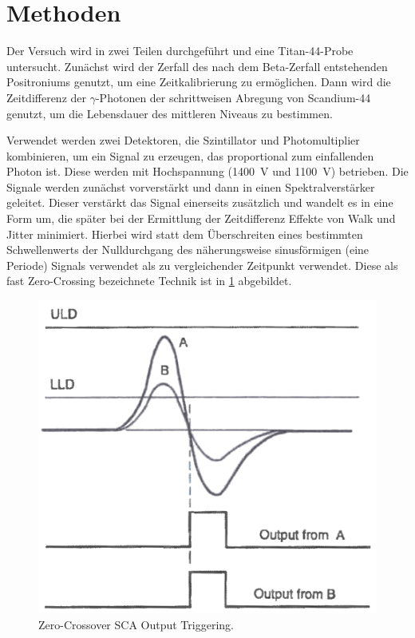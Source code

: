 \documentclass[
	a4paper,
	12pt,
	pagesize,
	ngerman
]{scrartcl}
\begin{document}
	\section{Methoden}
	Der Versuch wird in zwei Teilen durchgeführt und eine Titan-44-Probe untersucht.
	Zunächst wird der Zerfall des nach dem Beta-Zerfall entstehenden Positroniums genutzt, um eine Zeitkalibrierung zu ermöglichen.
	Dann wird die Zeitdifferenz der $\gamma$-Photonen der schrittweisen Abregung von Scandium-44 genutzt, um die Lebensdauer des mittleren Niveaus zu bestimmen.


	Verwendet werden zwei Detektoren, die Szintillator und Photomultiplier kombinieren, um ein Signal zu erzeugen, das proportional zum einfallenden Photon ist.
	Diese werden mit Hochspannung (\SI{1400}{V} und \SI{1100}{V}) betrieben.
	Die Signale werden zunächst vorverstärkt und dann in einen Spektralverstärker geleitet.
	Dieser verstärkt das Signal einerseits zusätzlich und wandelt es in eine Form um, die später bei der Ermittlung der Zeitdifferenz Effekte von Walk und Jitter minimiert.
	Hierbei wird statt dem Überschreiten eines bestimmten Schwellenwerts der Nulldurchgang des näherungsweise sinusförmigen (eine Periode) Signals verwendet als zu vergleichender Zeitpunkt verwendet.
	Diese als fast Zero-Crossing bezeichnete Technik ist in \cref{fig_Zero-Cross} abgebildet.

	\begin{figure}[H]
			\includegraphics[width=0.6\linewidth]{img/Zero-Cross}
			\caption{
			Zero-Crossover SCA Output Triggering.
			\cite{Anleitung}
			}
			\label{fig_Zero-Cross}
	\end{figure}
\end{document}
